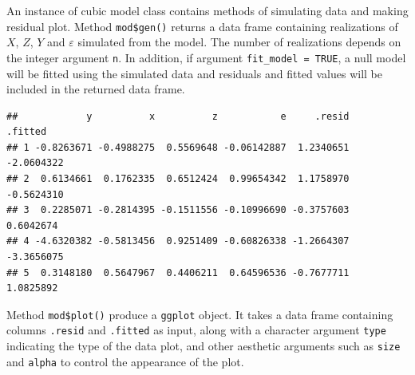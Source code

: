 \documentclass{monashthesis}
\theoremstyle{definition}
\theoremstyle{definition}
\theoremstyle{definition}
\theoremstyle{definition}
\theoremstyle{remark}
\begin{document}
\begin{Shaded}
\begin{Highlighting}[]
\OtherTok{\textless{}{-}} \NormalTok{(} \SpecialCharTok{{-}}\NormalTok{, } \SpecialCharTok{{-}}\NormalTok{, } \NormalTok{, } \NormalTok{, }
                    \NormalTok{(}\SpecialCharTok{{-}}\NormalTok{, }\NormalTok{), } \NormalTok{(}\SpecialCharTok{{-}}\NormalTok{, }\NormalTok{))}
\end{Highlighting}
\end{Shaded}

An instance of cubic model class contains methods of simulating data and making residual plot. Method \texttt{mod\$gen()} returns a data frame containing realizations of \(X\), \(Z\), \(Y\) and \(\varepsilon\) simulated from the model. The number of realizations depends on the integer argument \texttt{n}. In addition, if argument \texttt{fit\_model\ =\ TRUE}, a null model will be fitted using the simulated data and residuals and fitted values will be included in the returned data frame.

\begin{Shaded}
\begin{Highlighting}[]
\SpecialCharTok{$}\NormalTok{(} \NormalTok{, } \NormalTok{)}
\end{Highlighting}
\end{Shaded}

\begin{verbatim}
##            y          x          z           e     .resid    .fitted
## 1 -0.8263671 -0.4988275  0.5569648 -0.06142887  1.2340651 -2.0604322
## 2  0.6134661  0.1762335  0.6512424  0.99654342  1.1758970 -0.5624310
## 3  0.2285071 -0.2814395 -0.1511556 -0.10996690 -0.3757603  0.6042674
## 4 -4.6320382 -0.5813456  0.9251409 -0.60826338 -1.2664307 -3.3656075
## 5  0.3148180  0.5647967  0.4406211  0.64596536 -0.7677711  1.0825892
\end{verbatim}

Method \texttt{mod\$plot()} produce a \texttt{ggplot} \autocite{wickham_ggplot2_2011} object. It takes a data frame containing columns \texttt{.resid} and \texttt{.fitted} as input, along with a character argument \texttt{type} indicating the type of the data plot, and other aesthetic arguments such as \texttt{size} and \texttt{alpha} to control the appearance of the plot.
\end{document}
